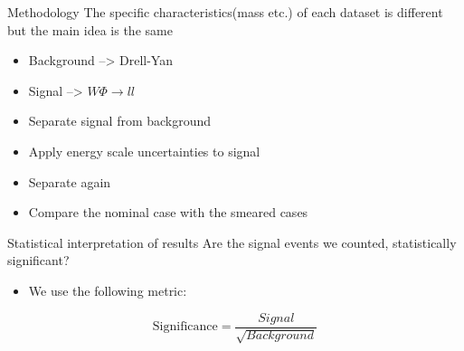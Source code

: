 \documentclass[bigger]{beamer}
\begin{document}
\begin{frame}[label={sec:org928b5c7}]{Methodology}
The specific characteristics(mass etc.) of each dataset  is different but the main idea is the same
\begin{itemize}
\item Background --> Drell-Yan
\item Signal --> \(W\Phi \rightarrow ll\)
\item Separate signal from background
\item Apply energy scale uncertainties to signal
\item Separate again
\item Compare the nominal case with the smeared cases
\end{itemize}
\end{frame}
\begin{frame}[label={sec:org069ca85}]{Statistical interpretation of results}
\alert{Are the signal events we counted, statistically significant?}
\begin{itemize}
\item We use the following metric:
\end{itemize}
\begin{equation}
\text{Significance} = \frac{Signal}{\sqrt{Background}}
\end{equation}
\end{frame}
\end{document}
